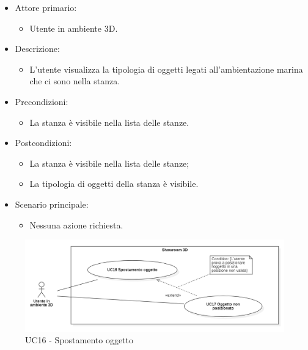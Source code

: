 \begin{itemize}

	\item Attore primario: 
	\begin{itemize}
		\item Utente in ambiente 3D.
	\end{itemize}
	\item Descrizione:
	\begin{itemize}
		\item L'utente visualizza la tipologia di oggetti legati all'ambientazione marina che ci sono nella stanza.
	\end{itemize}
	
	\item Precondizioni:
	\begin{itemize}
		\item La stanza è visibile nella lista delle stanze.
	\end{itemize}
	
	\item Postcondizioni:
	\begin{itemize}
		\item La stanza è visibile nella lista delle stanze;
		\item La tipologia di oggetti della stanza è visibile.
	\end{itemize}
	
	\item Scenario principale:
	\begin{itemize}
		\item Nessuna azione richiesta.
	\end{itemize}
	
\end{itemize}

\pagebreak

\begin{figure}[H]
  \renewcommand{\thefigure}{17}
  \includegraphics[width=\linewidth]{./res/images/UC16-17.png}
  \caption{UC16 - Spostamento oggetto}
  \label{fig:UC 16 e 17}
\end{figure}

